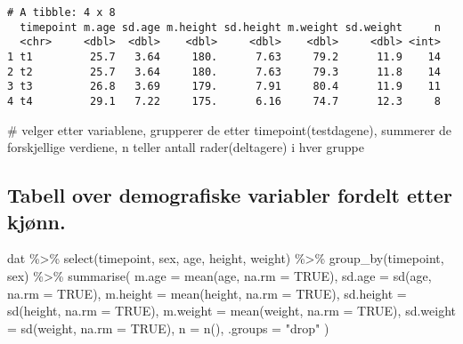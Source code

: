 \documentclass[
  letterpaper,
  DIV=11,
  numbers=noendperiod]{scrreprt}
\newenvironment{Shaded}{\begin{snugshade}}{\end{snugshade}}
\newcommand{\AttributeTok}[1]{\textcolor[rgb]{0.40,0.45,0.13}{#1}}
\newcommand{\CommentTok}[1]{\textcolor[rgb]{0.37,0.37,0.37}{#1}}
\newcommand{\ConstantTok}[1]{\textcolor[rgb]{0.56,0.35,0.01}{#1}}
\newcommand{\FunctionTok}[1]{\textcolor[rgb]{0.28,0.35,0.67}{#1}}
\newcommand{\NormalTok}[1]{\textcolor[rgb]{0.00,0.23,0.31}{#1}}
\newcommand{\SpecialCharTok}[1]{\textcolor[rgb]{0.37,0.37,0.37}{#1}}
\newcommand{\StringTok}[1]{\textcolor[rgb]{0.13,0.47,0.30}{#1}}
\begin{document}
\begin{verbatim}
# A tibble: 4 x 8
  timepoint m.age sd.age m.height sd.height m.weight sd.weight     n
  <chr>     <dbl>  <dbl>    <dbl>     <dbl>    <dbl>     <dbl> <int>
1 t1         25.7   3.64     180.      7.63     79.2      11.9    14
2 t2         25.7   3.64     180.      7.63     79.3      11.8    14
3 t3         26.8   3.69     179.      7.91     80.4      11.9    11
4 t4         29.1   7.22     175.      6.16     74.7      12.3     8
\end{verbatim}

\begin{Shaded}
\begin{Highlighting}[]
\CommentTok{\# velger etter variablene, grupperer de etter timepoint(testdagene), summerer de forskjellige verdiene, n teller antall rader(deltagere) i hver gruppe }
\end{Highlighting}
\end{Shaded}

\subsection{Tabell over demografiske variabler fordelt etter
kjønn.}\label{tabell-over-demografiske-variabler-fordelt-etter-kjuxf8nn.}

\begin{Shaded}
\begin{Highlighting}[]
\NormalTok{dat }\SpecialCharTok{\%\textgreater{}\%}
  \FunctionTok{select}\NormalTok{(timepoint, sex, age, height, weight) }\SpecialCharTok{\%\textgreater{}\%}
  \FunctionTok{group\_by}\NormalTok{(timepoint, sex) }\SpecialCharTok{\%\textgreater{}\%}
  \FunctionTok{summarise}\NormalTok{(}
    \AttributeTok{m.age =} \FunctionTok{mean}\NormalTok{(age, }\AttributeTok{na.rm =} \ConstantTok{TRUE}\NormalTok{),}
    \AttributeTok{sd.age =} \FunctionTok{sd}\NormalTok{(age, }\AttributeTok{na.rm =} \ConstantTok{TRUE}\NormalTok{),}
    \AttributeTok{m.height =} \FunctionTok{mean}\NormalTok{(height, }\AttributeTok{na.rm =} \ConstantTok{TRUE}\NormalTok{),}
    \AttributeTok{sd.height =} \FunctionTok{sd}\NormalTok{(height, }\AttributeTok{na.rm =} \ConstantTok{TRUE}\NormalTok{),}
    \AttributeTok{m.weight =} \FunctionTok{mean}\NormalTok{(weight, }\AttributeTok{na.rm =} \ConstantTok{TRUE}\NormalTok{),}
    \AttributeTok{sd.weight =} \FunctionTok{sd}\NormalTok{(weight, }\AttributeTok{na.rm =} \ConstantTok{TRUE}\NormalTok{),}
    \AttributeTok{n =} \FunctionTok{n}\NormalTok{(),}
    \AttributeTok{.groups =} \StringTok{"drop"}
\NormalTok{  )}
\end{Highlighting}
\end{Shaded}
\end{document}
